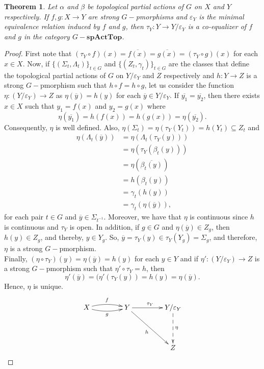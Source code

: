 \documentclass[sn-mathphys-num]{sn-jnl}%
\theoremstyle{thmstyleone}%
\newtheorem{theorem}{Theorem}%
\theoremstyle{thmstyletwo}%
\theoremstyle{thmstylethree}%
\begin{document}
\begin{theorem}
Let $ \alpha $ and $ \beta $ be topological partial actions of $ G $ on  $ X $ and $ Y $ respectively. If $ f, g: X \to Y $ are strong $G-$pmorphisms and $ \varepsilon_Y $ is the minimal equivalence relation induced by $ f $ and $ g $, then $ \tau_Y: Y \to Y / \varepsilon_Y $ is a co-equalizer of $ f $ and $ g $ in the category $G-\mathbf{spActTop}$.
\end{theorem}
\begin{proof}
First note that $ (\tau_Y \circ f) (x) = \overline {f (x)} = \overline {g (x)} = (\tau_Y \circ g) (x) $ for each $ x \in X $. Now, if $ \{(\Sigma_t, \Lambda_t) \}_{t \in G} $ and $ \{(Z_t, \gamma_t) \}_{t \in G} $ are the classes  that define the topological partial actions of $G$ on  $ Y/\varepsilon_Y $  and  $ Z $ respectively and $ h: Y \to Z $ is a strong $ G-$pmorphism such that $ h \circ f = h \circ g $, let us consider the function $ \eta: (Y / \varepsilon_Y) \to Z $ as $ \eta (\overline {y}) = h (y) $ for each $ \overline {y} \in Y / \varepsilon_Y $. If $ \overline{y_1} = \overline{y_2} $, then there exists $ x \in X $ such that $ y_1 = f (x) $ and $ y_2 = g (x) $ where $$ \eta (\overline{y_1}) = h (f (x)) = h (g (x)) = \eta (\overline{y_2} ).$$
Consequently, $ \eta $ is well defined. Also, $\eta(\Sigma_t)=\eta(\tau_Y(Y_t))=h(Y_t)\subseteq Z_t$ and
\begin{align*}
\eta (\Lambda_t(\overline{y})) &=\eta (\Lambda_t(\tau_Y(y)))\\
&=\eta (\tau_Y(\beta_t( y))) \\
&=\eta (\overline {\beta_t( y)})\\
&= h (\beta_t( y))\\
&= \gamma_t( h (y)) \\
&= \gamma_t(\eta (\overline {y})),
\end{align*}
for each pair $ t \in G $ and $ \overline {y} \in \Sigma_{t^{-1}} $. Moreover, we have that $ \eta $ is continuous since $ h $ is continuous and $ \tau_Y $ is open.  In addition, if $g\in G$ and $\eta(\overline{y})\in Z_g$, then $h(y)\in Z_g$, and thereby, $y\in Y_{g}$. So, $\overline{y}=\tau_Y(y)\in \tau_Y(Y_g)= \Sigma_g$, and therefore, $ \eta $ is a strong $ G-$pmorphism.\\

Finally, $ (\eta \circ \tau_Y) (y) = \eta (\overline {y}) = h (y) $ for each $y\in Y $ and if $ \eta':( Y / \varepsilon_Y ) \to Z $ is a strong $ G-$pmorphism such that $ \eta '\circ \tau_Y = h $, then $$ \eta' (\overline {y}) = (\eta'(\tau_Y (y)) = h (y) = \eta (\overline{y}).$$
Hence, $ \eta $ is unique.
$$
\xymatrix@=1.5cm{
X \ar@/_0.4pc/[r]_{g} \ar@/_{-0.4pc}/[r]^{f}& Y \ar[r]^{\tau_Y} \ar[dr]_{h} &  Y/\varepsilon_Y \ar@{-->}[d]^{\eta}\\
&   & Z
}
$$
\end{proof}
\end{document}
